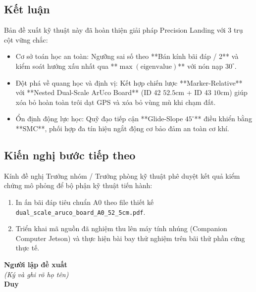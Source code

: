\documentclass[12pt,a4paper]{article}
\begin{document}
\subsection{Kết luận}
Bản đề xuất kỹ thuật này đã hoàn thiện giải pháp Precision Landing với 3 trụ cột vững chắc:
\begin{itemize}[noitemsep,topsep=2pt]
    \item Cơ sở toán học an toàn: Ngưỡng sai số theo **Bán kính bãi đáp / 2** và kiểm soát hướng xấu nhất qua **$\max(\text{eigenvalue})$** với nón nạp $30^\circ$.
    \item Đột phá về quang học và định vị: Kết hợp chiến lược **Marker-Relative** với **Nested Dual-Scale ArUco Board** (ID 42 $52.5\text{cm}$ + ID 43 $10\text{cm}$) giúp xóa bỏ hoàn toàn trôi dạt GPS và xóa bỏ vùng mù khi chạm đất.
    \item Ổn định động lực học: Quỹ đạo tiếp cận **Glide-Slope $45^\circ$** điều khiển bằng **SMC**, phối hợp đa tín hiệu ngắt động cơ bảo đảm an toàn cơ khí.
\end{itemize}

\subsection{Kiến nghị bước tiếp theo}
Kính đề nghị Trưởng nhóm / Trưởng phòng kỹ thuật phê duyệt kết quả kiểm chứng mô phỏng để bộ phận kỹ thuật tiến hành:
\begin{enumerate}[noitemsep]
    \item In ấn bãi đáp tiêu chuẩn A0 theo file thiết kế \texttt{dual\_scale\_aruco\_board\_A0\_52\_5cm.pdf}.
    \item Triển khai mã nguồn đã nghiệm thu lên máy tính nhúng (Companion Computer Jetson) và thực hiện bài bay thử nghiệm trên bãi thử phần cứng thực tế.
\end{enumerate}

\vspace{1.5em}
\begin{flushright}
    \textbf{Người lập đề xuất}\\
    \textit{(Ký và ghi rõ họ tên)}\\[3em]
    \textbf{Duy}
\end{flushright}
\end{document}
